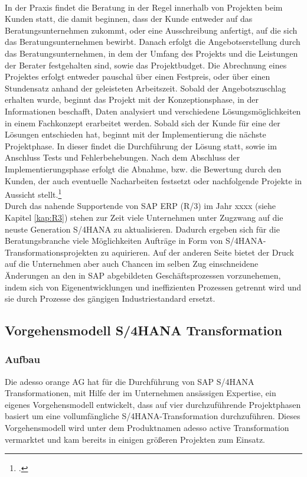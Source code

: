 \\In der Praxis findet die Beratung in der Regel innerhalb von Projekten beim Kunden statt, die damit beginnen, dass der Kunde entweder auf das Beratungsunternehmen zukommt, oder eine Ausschreibung anfertigt, auf die sich das Beratungsunternehmen bewirbt. Danach erfolgt die Angebotserstellung durch das Beratungsunternehmen, in dem der Umfang des Projekts und die Leistungen der Berater festgehalten sind, sowie das Projektbudget. Die Abrechnung eines Projektes erfolgt entweder pauschal über einen Festpreis, oder über einen Stundensatz anhand der geleisteten Arbeitszeit. Sobald der Angebotszuschlag erhalten wurde, beginnt das Projekt mit der Konzeptionsphase, in der Informationen beschafft, Daten analysiert und verschiedene Lösungsmöglichkeiten in einem Fachkonzept erarbeitet werden. Sobald sich der Kunde für eine der Lösungen entschieden hat, beginnt mit der Implementierung die nächste Projektphase. In dieser findet die Durchführung der Lösung statt, sowie im Anschluss Tests und Fehlerbehebungen. Nach dem Abschluss der Implementierungsphase erfolgt die Abnahme, bzw. die Bewertung durch den Kunden, der auch eventuelle Nacharbeiten festsetzt oder nachfolgende Projekte in Aussicht stellt.\footcite[Vgl.][]{gabler-beratung}
\\Durch das nahende Supportende von SAP ERP (R/3) im Jahr xxxx (siehe Kapitel \ref{kap:R3}) stehen zur Zeit viele Unternehmen unter Zugzwang auf die neuste Generation S/4HANA zu aktualisieren. Dadurch ergeben sich für die Beratungsbranche viele Möglichkeiten Aufträge in Form von S/4HANA-Transformationsprojekten zu aquirieren. Auf der anderen Seite bietet der Druck auf die Unternehmen aber auch Chancen im selben Zug einschneidene Änderungen an den in SAP abgebildeten Geschäftsprozessen vorzunehemen, indem sich von Eigenentwicklungen und ineffizienten Prozessen getrennt wird und sie durch Prozesse des gängigen Industriestandard ersetzt.

\subsection{Vorgehensmodell S/4HANA Transformation}
\subsubsection{Aufbau}
Die adesso orange AG hat für die Durchführung von SAP S/4HANA Transformationen, mit Hilfe der im Unternehmen ansässigen Expertise, ein eigenes Vorgehensmodell entwickelt, dass auf vier durchzuführende Projektphasen basiert um eine vollumfängliche S/4HANA-Transformation durchzuführen. Dieses Vorgehensmodell wird unter dem Produktnamen \glqq{}adesso active Transformation\grqq{} vermarktet und kam bereits in einigen größeren Projekten zum Einsatz. 

